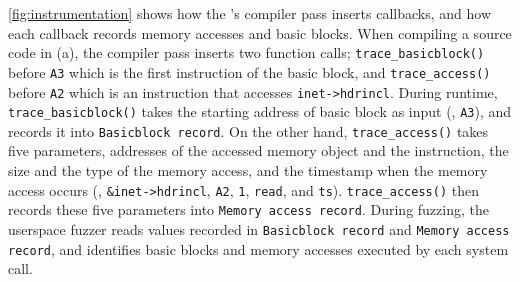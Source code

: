 \autoref{fig:instrumentation} shows how the \sys's compiler pass
inserts callbacks, and how each callback records memory accesses and
basic blocks.
%
When compiling a source code in (a), the compiler pass inserts two
function calls; \texttt{trace_basicblock()} before \texttt{A3} which
is the first instruction of the basic block, and
\texttt{trace_access()} before \texttt{A2} which is an instruction
that accesses \texttt{inet->hdrincl}.
%
During runtime, \texttt{trace_basicblock()} takes the starting address
of basic block as input (\ie, \texttt{A3}), and records it into
\texttt{Basicblock record}.
%
On the other hand, \texttt{trace_access()} takes five parameters,
addresses of the accessed memory object and the instruction, the size
and the type of the memory access, and the timestamp when the memory
access occurs (\ie, \texttt{\&inet->hdrincl}, \texttt{A2}, \texttt{1},
\texttt{read}, and \texttt{ts}).
%
\texttt{trace_access()} then records these five parameters into
\texttt{Memory access record}.
%
During fuzzing, the userspace fuzzer reads values recorded in
\texttt{Basicblock record} and \texttt{Memory access record}, and
identifies basic blocks and memory accesses executed by each system
call.













